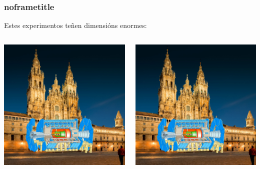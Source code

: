 \documentclass{beamer}
\begin{document}
\begin{frame}[default]
  \frametitle{noframetitle}

  Estes experimentos teñen dimensións enormes:

  \bigskip

  \begin{columns}
  \begin{column}{0.45\textwidth}
    \includegraphics[width=\textwidth, page=1]{gpx/size_examples.pdf}
  \end{column}
  \begin{column}{0.45\textwidth}
    \includegraphics[width=\textwidth, page=2]{gpx/size_examples.pdf}
  \end{column}
  \end{columns}

\end{frame}
\end{document}
